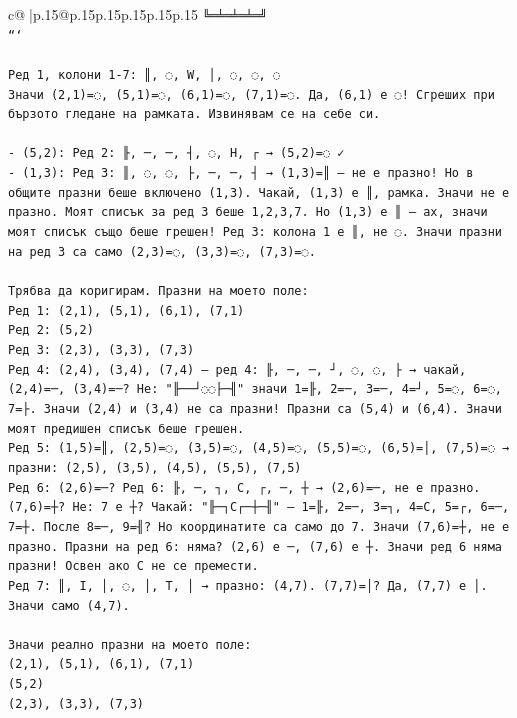 \documentclass{article}
\begin{document}
{\begin{supertabular}{c@{$\;$}|p{.15\linewidth}@{}p{.15\linewidth}p{.15\linewidth}p{.15\linewidth}p{.15\linewidth}p{.15\linewidth}}
{{{\texttt{╚═╧═╧═╧═╝} \\
\texttt{```} \\
\\ 
\texttt{Ред 1, колони 1{-}7: ║, ◌, W, │, ◌, ◌, ◌} \\
\texttt{Значи (2,1)=◌, (5,1)=◌, (6,1)=◌, (7,1)=◌. Да, (6,1) е ◌! Сгреших при бързото гледане на рамката. Извинявам се на себе си.} \\
\\ 
\texttt{{-} (5,2): Ред 2: ╟, ─, ─, ┤, ◌, H, ┌ → (5,2)=◌ ✓} \\
\texttt{{-} (1,3): Ред 3: ║, ◌, ◌, ├, ─, ─, ┤ → (1,3)=║ — не е празно! Но в общите празни беше включено (1,3). Чакай, (1,3) е ║, рамка. Значи не е празно. Моят списък за ред 3 беше 1,2,3,7. Но (1,3) е ║ — ах, значи моят списък също беше грешен! Ред 3: колона 1 е ║, не ◌. Значи празни на ред 3 са само (2,3)=◌, (3,3)=◌, (7,3)=◌.} \\
\\ 
\texttt{Трябва да коригирам. Празни на моето поле:} \\
\texttt{Ред 1: (2,1), (5,1), (6,1), (7,1)} \\
\texttt{Ред 2: (5,2)} \\
\texttt{Ред 3: (2,3), (3,3), (7,3)} \\
\texttt{Ред 4: (2,4), (3,4), (7,4) — ред 4: ╟, ─, ─, ┘, ◌, ◌, ├ → чакай, (2,4)=─, (3,4)=─? Не: "╟──┘◌◌├─╢" значи 1=╟, 2=─, 3=─, 4=┘, 5=◌, 6=◌, 7=├. Значи (2,4) и (3,4) не са празни! Празни са (5,4) и (6,4). Значи моят предишен списък беше грешен.} \\
\texttt{Ред 5: (1,5)=║, (2,5)=◌, (3,5)=◌, (4,5)=◌, (5,5)=◌, (6,5)=│, (7,5)=◌ → празни: (2,5), (3,5), (4,5), (5,5), (7,5)} \\
\texttt{Ред 6: (2,6)=─? Ред 6: ╟, ─, ┐, C, ┌, ─, ┼ → (2,6)=─, не е празно. (7,6)=┼? Не: 7 е ┼? Чакай: "╟─┐C┌─┼─╢" — 1=╟, 2=─, 3=┐, 4=C, 5=┌, 6=─, 7=┼. После 8=─, 9=╢? Но координатите са само до 7. Значи (7,6)=┼, не е празно. Празни на ред 6: няма? (2,6) е ─, (7,6) е ┼. Значи ред 6 няма празни! Освен ако C не се премести.} \\
\texttt{Ред 7: ║, I, │, ◌, │, T, │ → празно: (4,7). (7,7)=│? Да, (7,7) е │. Значи само (4,7).} \\
\\ 
\texttt{Значи реално празни на моето поле:} \\
\texttt{(2,1), (5,1), (6,1), (7,1)} \\
\texttt{(5,2)} \\
\texttt{(2,3), (3,3), (7,3)} \\
}}}
\end{supertabular}}
\end{document}
